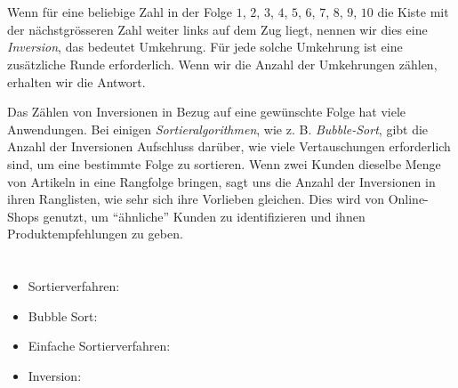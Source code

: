 {{%
\section*{\BrochureItsInformatics}
Wenn für eine beliebige Zahl in der Folge $1$, $2$, $3$, $4$, $5$, $6$, $7$, $8$, $9$, $10$ die Kiste mit der nächstgrösseren Zahl weiter links auf dem Zug liegt, nennen wir dies eine \emph{Inversion}, das bedeutet Umkehrung. Für jede solche Umkehrung ist eine zusätzliche Runde erforderlich. Wenn wir die Anzahl der Umkehrungen zählen, erhalten wir die Antwort.

Das Zählen von Inversionen in Bezug auf eine gewünschte Folge hat viele Anwendungen. Bei einigen \emph{Sortieralgorithmen}, wie z. B. \emph{Bubble-Sort}, gibt die Anzahl der Inversionen Aufschluss darüber, wie viele Vertauschungen erforderlich sind, um eine bestimmte Folge zu sortieren. Wenn zwei Kunden dieselbe Menge von Artikeln in eine Rangfolge bringen, sagt uns die Anzahl der Inversionen in ihren Ranglisten, wie sehr sich ihre Vorlieben gleichen. Dies wird von Online-Shops genutzt, um \enquote{ähnliche} Kunden zu identifizieren und ihnen Produktempfehlungen zu geben.



\section*{\BrochureWebsitesAndKeywords}
{\raggedright
\begin{itemize}
  \item Sortierverfahren: \href{https://de.wikipedia.org/wiki/Sortierverfahren}{}
  \item Bubble Sort: \href{https://de.wikipedia.org/wiki/Bubblesort}{}
  \item Einfache Sortierverfahren: \href{https://hpi.de/friedrich/teaching/units/einfache-sortierverfahren.html}{}
  \item Inversion: \href{https://www.ziemke-koeln.de/unterricht/informatik/gk12/sortieren/suchen_sortieren.htm\#Inversion}{}
\end{itemize}


}}}
